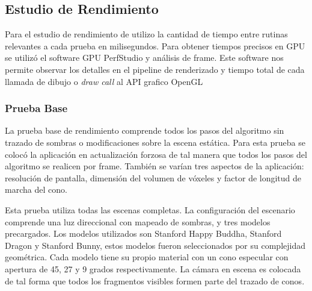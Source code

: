 \subsection{Estudio de Rendimiento}

Para el estudio de rendimiento de utilizo la cantidad de tiempo entre rutinas relevantes a cada prueba en milisegundos. Para obtener tiempos precisos en GPU se utilizó el software GPU PerfStudio y análisis de frame. Este software nos permite observar los detalles en el pipeline de renderizado y tiempo total de cada llamada de dibujo o \emph{draw call} al API grafico OpenGL

\subsubsection{Prueba Base}
La prueba base de rendimiento comprende todos los pasos del algoritmo sin trazado de sombras o modificaciones sobre la escena estática. Para esta prueba se colocó la aplicación en actualización forzosa de tal manera que todos los pasos del algoritmo se realicen por frame. También se varían tres aspectos de la aplicación: resolución de pantalla, dimensión del volumen de vóxeles y factor de longitud de marcha del cono.

Esta prueba utiliza todas las escenas completas. La configuración del escenario comprende una luz direccional con mapeado de sombras, y tres modelos precargados. Los modelos utilizados son Stanford Happy Buddha, Stanford Dragon y Stanford Bunny, estos modelos fueron seleccionados por su complejidad geométrica. Cada modelo tiene su propio material con un cono especular con apertura de 45, 27 y 9 grados respectivamente. La cámara en escena es colocada de tal forma que todos los fragmentos visibles formen parte del trazado de conos. 

